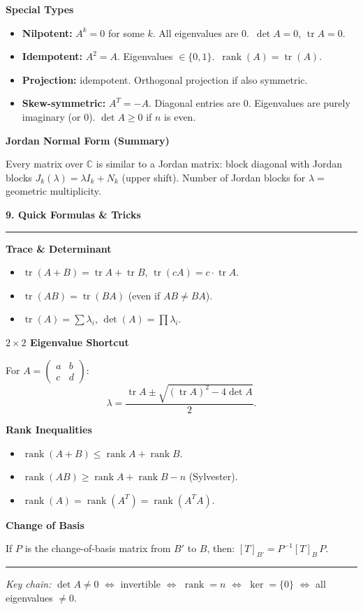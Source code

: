 \documentclass[10pt,twocolumn]{article}
\newcommand{\sect}[1]{\medskip\noindent\textbf{\large #1}\medskip\hrule\smallskip}
\newcommand{\subsect}[1]{\smallskip\noindent\textbf{#1}\par}
\DeclareMathOperator{\rank}{rank}
\DeclareMathOperator{\tr}{tr}
\begin{document}
\subsect{Special Types}
\begin{itemize}[nosep,leftmargin=*]
\item \textbf{Nilpotent:} $A^k=0$ for some $k$. All eigenvalues are 0.\ $\det A=0$, $\tr A=0$.
\item \textbf{Idempotent:} $A^2=A$. Eigenvalues $\in\{0,1\}$.\ $\rank(A)=\tr(A)$.
\item \textbf{Projection:} idempotent. Orthogonal projection if also symmetric.
\item \textbf{Skew-symmetric:} $A^T=-A$. Diagonal entries are 0. Eigenvalues are purely imaginary (or 0). $\det A\ge 0$ if $n$ is even.
\end{itemize}

\subsect{Jordan Normal Form (Summary)}
Every matrix over $\mathbb{C}$ is similar to a Jordan matrix: block diagonal with Jordan blocks $J_k(\lambda)=\lambda I_k + N_k$ (upper shift). Number of Jordan blocks for $\lambda=$ geometric multiplicity.

\sect{9. Quick Formulas \& Tricks}

\subsect{Trace \& Determinant}
\begin{itemize}[nosep,leftmargin=*]
\item $\tr(A+B)=\tr A+\tr B$, \quad $\tr(cA)=c\cdot\tr A$.
\item $\tr(AB)=\tr(BA)$ (even if $AB\neq BA$).
\item $\tr(A)=\sum\lambda_i$, \quad $\det(A)=\prod\lambda_i$.
\end{itemize}

\subsect{$2\times 2$ Eigenvalue Shortcut}
For $A=\begin{pmatrix}a&b\\c&d\end{pmatrix}$:
\[
\lambda = \frac{\tr A\pm\sqrt{(\tr A)^2-4\det A}}{2}.
\]

\subsect{Rank Inequalities}
\begin{itemize}[nosep,leftmargin=*]
\item $\rank(A+B)\le\rank A+\rank B$.
\item $\rank(AB)\ge\rank A+\rank B-n$ (Sylvester).
\item $\rank(A)=\rank(A^T)=\rank(A^TA)$.
\end{itemize}

\subsect{Change of Basis}
If $P$ is the change-of-basis matrix from $B'$ to $B$, then:
$[T]_{B'}=P^{-1}[T]_B\,P$.

\bigskip
\hrule
\smallskip
\begin{center}
\textit{Key chain:}\; $\det A\neq 0$ $\iff$ invertible $\iff$ $\rank=n$ $\iff$ $\ker=\{0\}$ $\iff$ all eigenvalues $\neq 0$.
\end{center}
\end{document}
